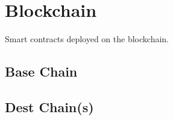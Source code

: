 \section{Blockchain}
\label{sec:blockchain}

Smart contracts deployed on the blockchain.

\subsection{Base Chain}
\label{subsec:base_chain}

\subsection{Dest Chain(s)}
\label{subsec:dest_chain(s)} 
